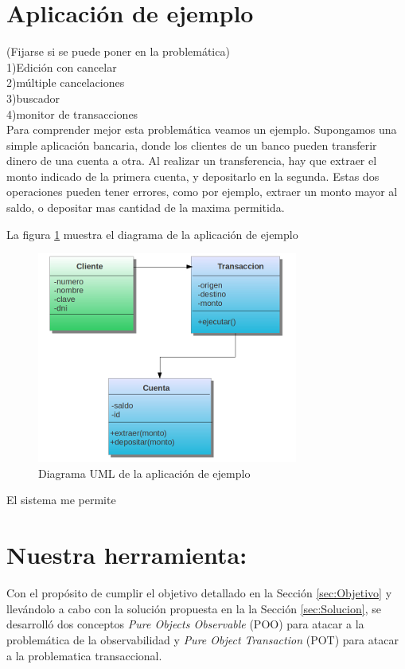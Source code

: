 \section{Aplicación de ejemplo}
(Fijarse si se puede poner en la problemática)\\
1)Edición con cancelar\\
2)múltiple cancelaciones\\
3)buscador\\
4)monitor de transacciones\\

Para comprender mejor esta problemática veamos un ejemplo. Supongamos una simple
aplicación bancaria, donde los clientes de un banco pueden transferir dinero de
una cuenta a otra. Al realizar un transferencia, hay que extraer el monto
indicado de la primera cuenta, y depositarlo en la segunda. Estas dos
operaciones pueden tener errores, como por ejemplo, extraer un monto mayor al
saldo, o depositar mas cantidad de la maxima permitida.

La  figura \ref{example} muestra el diagrama de la aplicación de
ejemplo

	\begin{figure}[h]
		\includegraphics{img/objectTransaction}
		\caption{Diagrama UML de la aplicación de ejemplo}
		\label{example}
	\end{figure}	


El sistema me permite 

\section{Nuestra herramienta: }

Con el propósito de cumplir el objetivo detallado en la Sección
\ref{sec:Objetivo} y llevándolo a cabo con la solución propuesta en la  la
Sección \ref{sec:Solucion}, se desarrolló dos conceptos \emph{Pure Objects
Observable} (POO)  para atacar a la problemática de la observabilidad y
\emph{Pure Object Transaction} (POT) para atacar a la problematica
transaccional.

